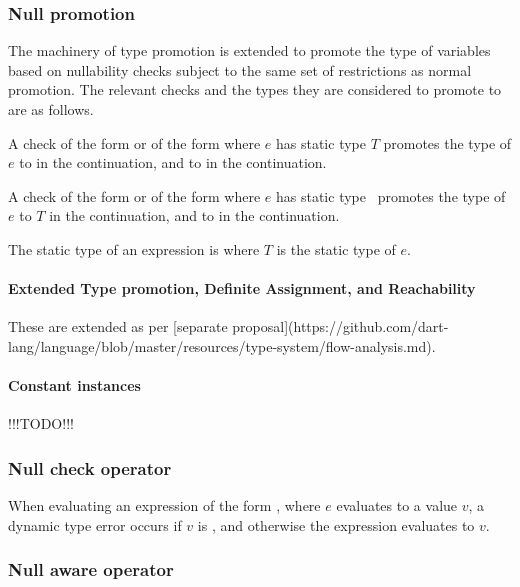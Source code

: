 \documentclass[makeidx]{article}
\begin{document}
{\subsubsection{Null promotion}

The machinery of type promotion is extended to promote the type of
variables based on nullability checks subject to the same set of
restrictions as normal promotion.  The relevant checks and the types
they are considered to promote to are as follows.

A check of the form  or of the form
 where $e$ has static type $T$ promotes the
type of $e$ to  in the  continuation, and to
 in the  continuation.

A check of the form  or of the form
 where $e$ has static type
\ promotes the type of $e$ to $T$ in the 
continuation, and to  in the  continuation.

The static type of an expression  is 
where $T$ is the static type of $e$.

\paragraph{Extended Type promotion, Definite Assignment, and Reachability}

These are extended as per
[separate proposal](https://github.com/dart-lang/language/blob/master/resources/type-system/flow-analysis.md).

\paragraph{Constant instances}

!!!TODO!!!


\subsubsection{Null check operator}

When evaluating an expression of the form ,
where $e$ evaluates to a value $v$,
a dynamic type error occurs if $v$ is ,
and otherwise the expression evaluates to $v$.

\subsubsection{Null aware operator}

}
\end{document}
